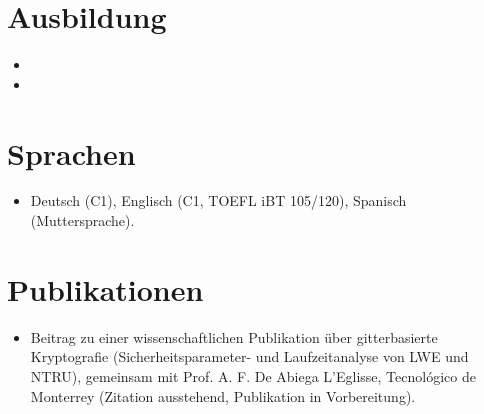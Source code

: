 \documentclass[11pt,a4paper,sans]{moderncv}
\begin{document}

\section{Ausbildung}
\vspace{1pt}
\begin{itemize}

\item{}

\vspace{3pt}

\item{}

\end{itemize}


\section{Sprachen}
\vspace{1pt}
\begin{itemize}
\item Deutsch (C1), Englisch (C1, TOEFL iBT 105/120), Spanisch (Muttersprache).
\end{itemize}


\section{Publikationen}
\vspace{1pt}
\begin{itemize}
\item Beitrag zu einer wissenschaftlichen Publikation über gitterbasierte Kryptografie (Sicherheitsparameter- und Laufzeitanalyse von LWE und NTRU), gemeinsam mit Prof. A. F. De Abiega L'Eglisse, Tecnológico de Monterrey (Zitation ausstehend, Publikation in Vorbereitung).
\end{itemize}
\end{document}

